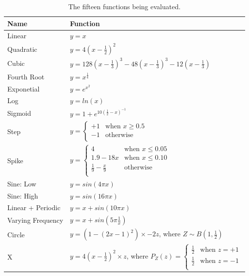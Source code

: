 \documentclass[a4paper, 12pt]{report}
\begin{document}
\begin{table}[h]
\centering
\begin{tabular}{ll}
  \hline
Name & Function  \\ 
  \hline
Linear &  $y = x$ \\ 
 Quadratic &  $y=4(x-\frac{1}{2})^2$ \\ 
  Cubic &  $y = 128(x-\frac{1}{3})^3 -48(x-\frac{1}{3})^3 -12(x-\frac{1}{3}) $\\ 
  Fourth Root &  $y = x^{\frac{1}{4}}$ \\ 
  Exponetial &  $y = e^{x^2}$ \\ 
  Log &  $y = ln(x)$ \\ 
  Sigmoid &  $y = 1 + e^{10(\frac{1}{2}-x)^{-1}}$ \\ 
  Step &   $
y =
\begin{cases} 
+1 &\text{when } x \ge 0.5\\
-1 &\text{otherwise} \\
\end{cases}$\\ 
  Spike &  $
y =
\begin{cases} 
4 &\text{when } x \le 0.05\\
1.9 -18x &\text{when } x \le 0.10\\
\frac{1}{9} - \frac{x}{9}&\text{otherwise} \\
\end{cases}$ \\ 
  Sine: Low &  $y = sin(4 \pi x)$  \\ 
  Sine: High  &  $y = sin(16 \pi x)$  \\ 
  Linear + Periodic &  $y = x +  sin(10 \pi x)$  \\ 
  Varying Frequency &  $y = x +  sin(5 \pi \frac{1}{x})$  \\ 
  Circle &  $y = (1 - (2x -1)^2) \times -2z$, where $Z \sim B(1,\frac{1}{2})$ \\ 
  X &  $y = 4(x-\frac{1}{2})^2 \times z$, where $P_Z(z)= \begin{cases} 
\frac{1}{2} &\text{when } z = +1\\
\frac{1}{2} &\text{when } z = -1\\
\end{cases}$ \\ 
   \hline
\end{tabular}
\caption{The fifteen functions being evaluated.} 
\label{T:functions}
\end{table}
\end{document}

